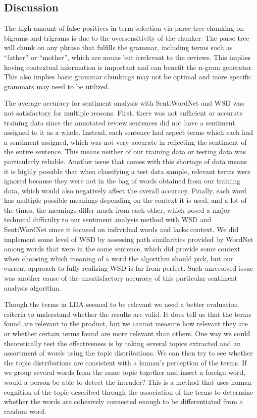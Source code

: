 \documentclass{article}
\begin{document}
\subsection{Discussion}
The high amount of false positives in term selection via parse tree chunking on bigrams and trigrams is due to the oversensitivity of the chunker. The parse tree will chunk on any phrase that fulfills the grammar, including terms such as “father” or “mother”, which are nouns but irrelevant to the reviews. This implies having contextual information is important and can benefit the n-gram generator. This also implies basic grammar chunkings may not be optimal and more specific grammars may need to be utilized.

The average accuracy for sentiment analysis with SentiWordNet and WSD was not satisfactory for multiple reasons. First, there was not sufficient or accurate training data since the annotated review sentences did not have a sentiment assigned to it as a whole. Instead, each sentence had aspect terms which each had a sentiment assigned, which was not very accurate in reflecting the sentiment of the entire sentence. This means neither of our training data or testing data was particularly reliable. Another issue that comes with this shortage of data means it is highly possible that when classifying a test data sample, relevant terms were ignored because they were not in the bag of words obtained from our training data, which would also negatively affect the overall accuracy. Finally, each word has multiple possible meanings depending on the context it is used, and a lot of the times, the meanings differ much from each other, which posed a major technical difficulty to our sentiment analysis method with WSD and SentiWordNet since it focused on individual words and lacks context. We did implement some level of WSD by assessing path similarities provided by WordNet among words that were in the same sentence, which did provide some context when choosing which meaning of a word the algorithm should pick, but our current approach to fully realizing WSD is far from perfect. Such unresolved issue was another cause of the unsatisfactory accuracy of this particular sentiment analysis algorithm.

Though the terms in LDA seemed to be relevant we need a better evaluation criteria to understand whether the results are valid. It does tell us that the terms found are relevant to the product, but we cannot measure how relevant they are or whether certain terms found are more relevant than others. One way we could theoretically test the effectiveness is by taking several topics extracted and an assortment of words using the topic distributions. We can then try to see whether the topic distributions are consistent with a human's perception of the terms. If we group several words from the same topic together and insert a foreign word, would a person be able to detect the intruder? This is a method that uses human cognition of the topic described through the association of the terms to determine whether the words are cohesively connected enough to be differentiated from a random word.
\end{document}
